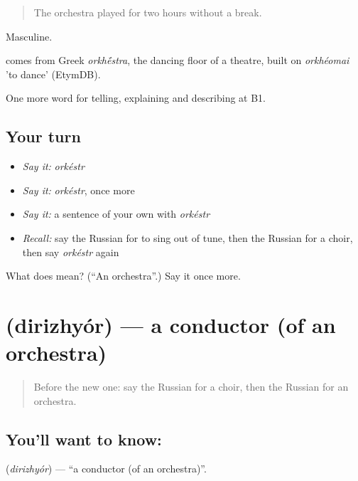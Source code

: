 \begin{quote}
The orchestra played for two hours without a break.
\end{quote}

Masculine.

\begin{cousinweb}
\emph{} comes from Greek \emph{orkh\'{\={e}}stra}, the dancing floor of a theatre, built on \emph{orkhéomai} 'to dance' (EtymDB).
\end{cousinweb}

\begin{grammarlens}[title={What you've built}]
One more word for telling, explaining and describing at B1.
\end{grammarlens}

\subsection*{Your turn}
\begin{itemize}
\raggedright
  \item \emph{Say it:} \emph{orkéstr}
  \item \emph{Say it:} \emph{orkéstr}, once more
  \item \emph{Say it:} a sentence of your own with \emph{orkéstr}
  \item \emph{Recall:} say the Russian for to sing out of tune, then the Russian for a choir, then say \emph{orkéstr} again
\end{itemize}

\begin{tcolorbox}[breakable,colback=teal!4,colframe=teal!35!black,title={Before you move on}]
What does  mean? (\textquotedblleft{}An orchestra\textquotedblright{}.) Say it once more.
\end{tcolorbox}
\section[\texorpdfstring{\ru{дирижёр} (dirizhyór)}{дирижёр (dirizhyór)}]{ (dirizhyór) — a conductor (of an orchestra)}

\label{lesson:RU-C517-dirizhyor}



\begin{quote}
Before the new one: say the Russian for a choir, then the Russian for an orchestra.
\end{quote}

\subsection*{You'll want to know: }
\textbf{} (\emph{dirizhyór}) — \textquotedblleft{}a conductor (of an orchestra)\textquotedblright{}.

